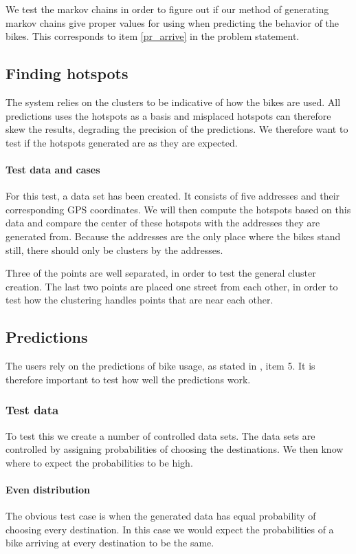 We test the markov chains in order to figure out if our method of generating markov chains give proper values for using when predicting the behavior of the bikes.
This corresponds to item \ref{pr_arrive} in the problem statement.

\subsection{Finding hotspots}
The system relies on the clusters to be indicative of how the bikes are used. 
All predictions uses the hotspots as a basis and misplaced hotspots can therefore skew the results, degrading the precision of the predictions.
We therefore want to test if the hotspots generated are as they are expected.

\paragraph{Test data and cases}
For this test, a data set has been created.
It consists of five addresses and their corresponding GPS coordinates.
We will then compute the hotspots based on this data and compare the center of these hotspots with the addresses they are generated from.
Because the addresses are the only place where the bikes stand still, there should only be clusters by the addresses.

Three of the points are well separated, in order to test the general cluster creation.
The last two points are placed one street from each other, in order to test how the clustering handles points that are near each other.

\subsection{Predictions}
The users rely on the predictions of bike usage, as stated in , item 5.
It is therefore important to test how well the predictions work.

\subsubsection{Test data} To test this we create a number of controlled data sets.
The data sets are controlled by assigning probabilities of choosing the destinations. 
We then know where to expect the probabilities to be high.

\paragraph{Even distribution}
The obvious test case is when the generated data has equal probability of choosing every destination. 
In this case we would expect the probabilities of a bike arriving at every destination to be the same.

